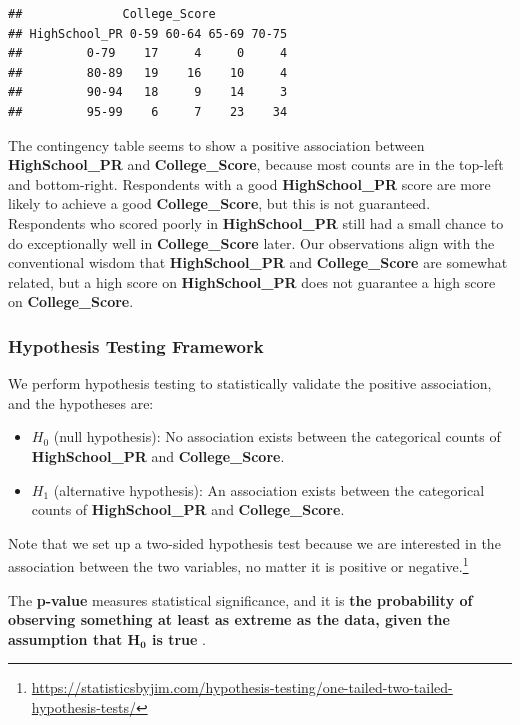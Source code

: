 \documentclass[
]{article}
\providecommand{\tightlist}{%
  \setlength{\itemsep}{0pt}\setlength{\parskip}{0pt}}
\begin{document}
\begin{verbatim}
##              College_Score
## HighSchool_PR 0-59 60-64 65-69 70-75
##         0-79    17     4     0     4
##         80-89   19    16    10     4
##         90-94   18     9    14     3
##         95-99    6     7    23    34
\end{verbatim}

The contingency table seems to show a positive association between
\textbf{HighSchool\_PR} and \textbf{College\_Score}, because most counts
are in the top-left and bottom-right. Respondents with a good
\textbf{HighSchool\_PR} score are more likely to achieve a good
\textbf{College\_Score}, but this is not guaranteed. Respondents who
scored poorly in \textbf{HighSchool\_PR} still had a small chance to do
exceptionally well in \textbf{College\_Score} later. Our observations
align with the conventional wisdom that \textbf{HighSchool\_PR} and
\textbf{College\_Score} are somewhat related, but a high score on
\textbf{HighSchool\_PR} does not guarantee a high score on
\textbf{College\_Score}.

\hypertarget{hypothesis-testing-framework}{%
\subsubsection{Hypothesis Testing
Framework}\label{hypothesis-testing-framework}}

We perform hypothesis testing to statistically validate the positive
association, and the hypotheses are:

\begin{itemize}
\tightlist
\item
  \(H_0\) (null hypothesis): No association exists between the
  categorical counts of \textbf{HighSchool\_PR} and
  \textbf{College\_Score}.
\item
  \(H_1\) (alternative hypothesis): An association exists between the
  categorical counts of \textbf{HighSchool\_PR} and
  \textbf{College\_Score}.
\end{itemize}

Note that we set up a two-sided hypothesis test because we are
interested in the association between the two variables, no matter it is
positive or negative.\footnote{\url{https://statisticsbyjim.com/hypothesis-testing/one-tailed-two-tailed-hypothesis-tests/}}

The \textbf{p-value} measures statistical significance, and it is
\textbf{the probability of observing something at least as extreme as the data, given the assumption that $\mathbf{H_0}$ is true}
\citep{diez2019openintro}.
\end{document}
